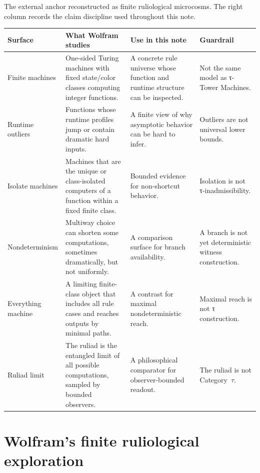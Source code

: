 \documentclass{pantarhei-researchnote}
\newcommand{\CategoryTau}{Category~\(\tau\)}
\begin{document}
\begin{widetable}[t]
\caption{The external anchor reconstructed as finite ruliological
microcosms. The right column records the claim discipline used throughout
this note.}
\label{tab:wolfram-microcosms}
\prtablefont
\begin{tabularx}{\textwidth}{p{}Y Y Y}
\toprule
\textbf{Surface} & \textbf{What Wolfram studies} & \textbf{Use in this note} & \textbf{Guardrail} \\
\midrule
Finite machines & One-sided Turing machines with fixed state/color
classes computing integer functions. & A concrete rule universe whose
function and runtime structure can be inspected. & Not the same model as
τ-Tower Machines. \\
Runtime outliers & Functions whose runtime profiles jump or contain
dramatic hard inputs. & A finite view of why asymptotic behavior can be
hard to infer. & Outliers are not universal lower bounds. \\
Isolate machines & Machines that are the unique or class-isolated
computers of a function within a fixed finite class. & Bounded evidence
for non-shortcut behavior. & Isolation is not τ-inadmissibility. \\
Nondeterminism & Multiway choice can shorten some computations, sometimes
dramatically, but not uniformly. & A comparison surface for branch
availability. & A branch is not yet deterministic witness construction. \\
Everything machine & A limiting finite-class object that includes all
rule cases and reaches outputs by minimal paths. & A contrast for maximal
nondeterministic reach. & Maximal reach is not τ construction. \\
Ruliad limit & The ruliad is the entangled limit of all possible
computations, sampled by bounded observers. & A philosophical comparator
for observer-bounded readout. & The ruliad is not \CategoryTau. \\
\bottomrule
\end{tabularx}
\end{widetable}

\section{Wolfram's finite ruliological exploration}
\label{sec:wolfram}
\end{document}
